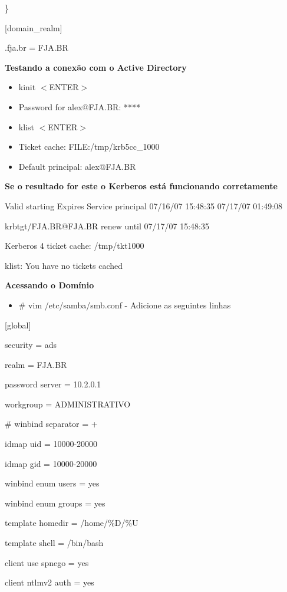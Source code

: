     \}

[domain\_realm]

.fja.br = FJA.BR

\textbf {Testando a conexão com o Active Directory}

\begin{itemize}
	\item {kinit $<$ENTER$>$}
	\item {Password for alex$@$FJA.BR: ****}
	\item {klist $<$ENTER$>$}
	\item {Ticket cache: FILE:/tmp/krb5cc\_1000}
	\item {Default principal: alex$@$FJA.BR}
\end{itemize}

\textbf {Se o resultado for este o Kerberos está funcionando corretamente}

	Valid starting Expires Service principal 07/16/07 15:48:35  07/17/07 01:49:08  

	krbtgt/FJA.BR@FJA.BR renew until 07/17/07 15:48:35
	
	Kerberos 4 ticket cache: /tmp/tkt1000
	
	klist: You have no tickets cached

\textbf{Acessando o Domínio}

\begin{itemize}
	\item {\# vim /etc/samba/smb.conf} -  Adicione as seguintes linhas
\end{itemize}

[global]

        security = ads

        realm = FJA.BR

        password server = 10.2.0.1

        workgroup = ADMINISTRATIVO

\#       winbind separator = +

        idmap uid = 10000-20000

        idmap gid = 10000-20000

        winbind enum users = yes

        winbind enum groups = yes

        template homedir = /home/\%D/\%U

        template shell = /bin/bash

        client use spnego = yes

        client ntlmv2 auth = yes

